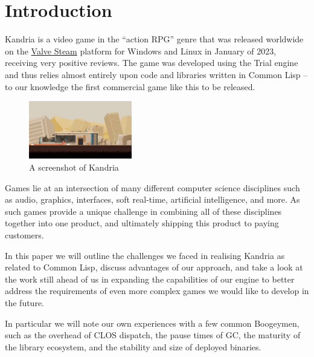 \documentclass[format=sigconf]{acmart}
\begin{document}
\maketitle

\def\abovecaptionskip{1pt}
\def\listingautorefname{Listing}
\def\figureautorefname{Figure}

\section{Introduction}\label{introduction}
Kandria is a video game in the ``action RPG'' genre that was released worldwide on the \href{https://kandria.com/steam}{Valve Steam} platform for Windows and Linux in January of 2023, receiving very positive reviews. The game was developed using the Trial engine and thus relies almost entirely upon code and libraries written in Common Lisp -- to our knowledge the first commercial game like this to be released.

\begin{figure}[h]
  \begin{centering}
    \includegraphics[width=0.4\textwidth]{screenshot 8.png}
  \end{centering}
  \caption{A screenshot of Kandria}
\end{figure}

Games lie at an intersection of many different computer science disciplines such as audio, graphics, interfaces, soft real-time, artificial intelligence, and more. As such games provide a unique challenge in combining all of these disciplines together into one product, and ultimately shipping this product to paying customers.

In this paper we will outline the challenges we faced in realising Kandria as related to Common Lisp, discuss advantages of our approach, and take a look at the work still ahead of us in expanding the capabilities of our engine to better address the requirements of even more complex games we would like to develop in the future.

In particular we will note our own experiences with a few common Boogeymen, such as the overhead of CLOS dispatch, the pause times of GC, the maturity of the library ecosystem, and the stability and size of deployed binaries.
\end{document}
